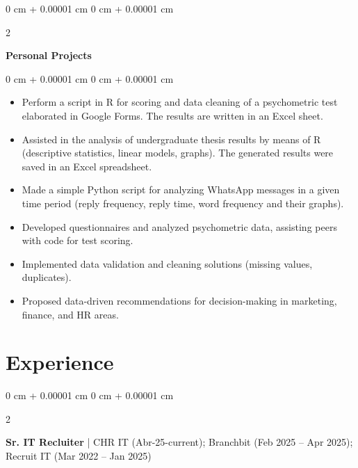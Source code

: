 \documentclass[10pt, a4paper]{article}
\newenvironment{highlights}{
    \begin{itemize}[
        topsep=0.10 cm,
        parsep=0.10 cm,
        partopsep=0pt,
        itemsep=0pt,
        leftmargin=0 cm + 10pt
    ]
}{
    \end{itemize}
} %
\newenvironment{onecolentry}{
    \begin{adjustwidth}{
        0 cm + 0.00001 cm
    }{
        0 cm + 0.00001 cm
    }
}{
    \end{adjustwidth}
} %
\newenvironment{twocolentry}[2][]{
    \onecolentry
    \def\secondColumn{#2}
    \setcolumnwidth{\fill, 4.5 cm}
    \begin{paracol}{2}
}{
    \switchcolumn \raggedleft \secondColumn
    \end{paracol}
    \endonecolentry
} %
\begin{document}
        \vspace{0.2 cm}

    \begin{twocolentry}{
            
        } 
            \textbf{Personal Projects}\end{twocolentry}

        \vspace{0.10 cm}
        \begin{onecolentry}
            \begin{highlights}
                \item Perform a script in R for scoring and data cleaning of a psychometric test elaborated in Google Forms. The results are written in an Excel sheet. 
                \item Assisted in the analysis of undergraduate thesis results by means of R (descriptive statistics, linear models, graphs). The generated results were saved in an Excel spreadsheet.
                \item Made a simple Python script for analyzing WhatsApp messages in a given time period (reply frequency, reply time, word frequency and their graphs).
                \item Developed questionnaires and analyzed psychometric data, assisting peers with code for test scoring.
                \item Implemented data validation and cleaning solutions (missing values, duplicates).
                \item Proposed data-driven recommendations for decision-making in marketing, finance, and HR areas.
            \end{highlights}
        \end{onecolentry}
        

        \vspace{0.2 cm}
        
\newpage
    \section{Experience}

 \begin{twocolentry}{
        }
            \textbf{Sr. IT Recluiter} | CHR IT (Abr-25-current); Branchbit (Feb 2025 – Apr 2025); Recruit IT (Mar 2022 – Jan 2025)\end{twocolentry}
\end{document}
